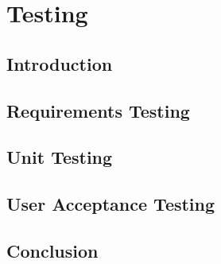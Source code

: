 \chapter{Testing}
\label{ch:testing}
\section{Introduction}
\section{Requirements Testing}
\section{Unit Testing}
\section{User Acceptance Testing}
\section{Conclusion}